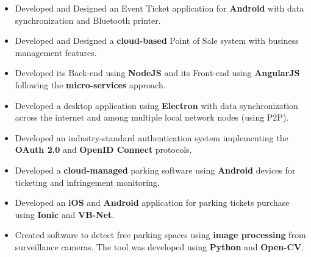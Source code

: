 \documentclass[10pt,a4paper,ragged2e]{altacv}
\begin{document}
\divider%

\clearpage
{}

\begin{itemize}
\item Developed and Designed an Event Ticket application for \textbf{Android} with data synchronization and Bluetooth printer.
\item Developed and Designed a \textbf{cloud-based} Point of Sale system with business management features.
\item Developed its Back-end using \textbf{NodeJS} and its Front-end using \textbf{AngularJS} following the \textbf{micro-services} approach.
\item Developed a desktop application using \textbf{Electron} with data synchronization across the internet and among multiple local network nodes (using P2P).
\item Developed an industry-standard authentication system implementing the \textbf{OAuth 2.0} and \textbf{OpenID Connect} protocols.
\end{itemize}

\divider%

\begin{itemize}
\item Developed a \textbf{cloud-managed} parking software using \textbf{Android} devices for ticketing and infringement monitoring.  
\item Developed an \textbf{iOS} and \textbf{Android} application for parking tickets purchase using \textbf{Ionic} and \textbf{VB-Net}.
\item Created software to detect free parking spaces using \textbf{image processing} from surveillance cameras. The tool was developed using \textbf{Python} and \textbf{Open-CV}\@.
\end{itemize}


\divider%

\end{document}
